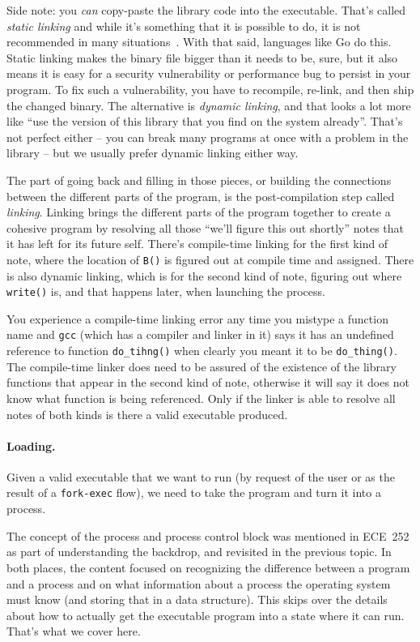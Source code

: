 Side note: you \textit{can} copy-paste the library code into the executable. That's called \textit{static linking} and while it's something that it is possible to do, it is not recommended in many situations~\cite{drepper-static}. With that said, languages like Go do this. Static linking makes the binary file bigger than it needs to be, sure, but it also means it is easy for a security vulnerability or performance bug to persist in your program. To fix such a vulnerability, you have to recompile, re-link, and then ship the changed binary. The alternative is \textit{dynamic linking}, and that looks a lot more like ``use the version of this library that you find on the system already''. That's not perfect either -- you can break many programs at once with a problem in the library -- but we usually prefer dynamic linking either way.

The part of going back and filling in those pieces, or building the connections between the different parts of the program, is the post-compilation step called \textit{linking}. Linking brings the different parts of the program together to create a cohesive program by resolving all those ``we'll figure this out shortly'' notes that it has left for its future self. There's compile-time linking for the first kind of note, where the location of \texttt{B()} is figured out at compile time and assigned. There is also dynamic linking, which is for the second kind of note, figuring out where \texttt{write()} is, and that happens later, when launching the process.

You experience a compile-time linking error any time you mistype a function name and \texttt{gcc} (which has a compiler and linker in it) says it has an undefined reference to function \texttt{do\_tihng()} when clearly you meant it to be \texttt{do\_thing()}. The compile-time linker does need to be assured of the existence of the library functions that appear in the second kind of note, otherwise it will say it does not know what function is being referenced.  Only if the linker is able to resolve all notes of both kinds is there a valid executable produced. 

\paragraph{Loading.} Given a valid executable that we want to run (by request of the user or as the result of a \texttt{fork-exec} flow), we need to take the program and turn it into a process.

The concept of the process and process control block was mentioned in ECE~252 as part of understanding the backdrop, and revisited in the previous topic. In both places, the content focused on recognizing the difference between a program and a process and on what information about a process the operating system must know (and storing that in a data structure). This skips over the details about how to actually get the executable program into a state where it can run. That's what we cover here.

